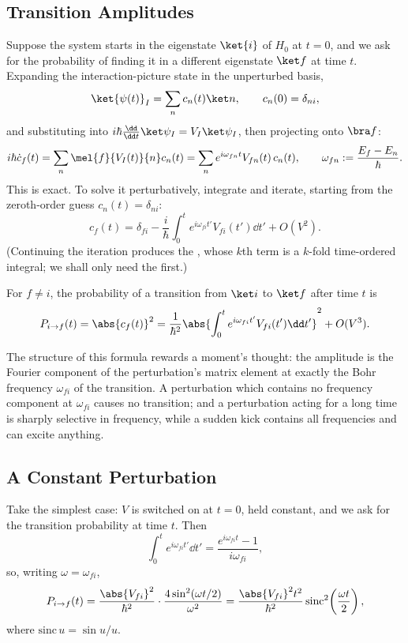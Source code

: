 \subsection{Transition Amplitudes}

Suppose the system starts in the eigenstate $\ket{i}$ of $H_0$ at $t=0$, and we ask for the probability of finding it in a different eigenstate $\ket f$ at time $t$. Expanding the interaction-picture state in the unperturbed basis,
$$
\ket{\psi(t)}_I = \sum_n c_n(t)\ket n, \qquad c_n(0) = \delta_{ni},
$$
and substituting into $i\hbar\frac{\dd}{\dd t}\ket\psi_I = V_I\ket\psi_I$, then projecting onto $\bra f$:
$$
i\hbar \dot c_f(t) = \sum_n \mel{f}{V_I(t)}{n}c_n(t) = \sum_n e^{i\omega_{fn}t}V_{fn}(t)\,c_n(t), \qquad \omega_{fn} := \frac{E_f - E_n}{\hbar}.
$$
This is exact. To solve it perturbatively, integrate and iterate, starting from the zeroth-order guess $c_n(t) = \delta_{ni}$:
$$
c_f(t) = \delta_{fi} - \frac{i}{\hbar}\int_0^t e^{i\omega_{fi}t'}V_{fi}(t')\dd t' + O(V^2).
$$
(Continuing the iteration produces the , whose $k$th term is a $k$-fold time-ordered integral; we shall only need the first.)

\begin{theorem}
    For $f \neq i$, the probability of a transition from $\ket i$ to $\ket f$ after time $t$ is
    $$
    P_{i\to f}(t) = \abs{c_f(t)}^2 = \frac{1}{\hbar^2}\abs{\int_0^t e^{i\omega_{fi}t'}V_{fi}(t')\dd t'}^2 + O(V^3).
    $$
\end{theorem}

The structure of this formula rewards a moment's thought: the amplitude is the Fourier component of the perturbation's matrix element at exactly the Bohr frequency $\omega_{fi}$ of the transition. A perturbation which contains no frequency component at $\omega_{fi}$ causes no transition; and a perturbation acting for a long time is sharply selective in frequency, while a sudden kick contains all frequencies and can excite anything.

\subsection{A Constant Perturbation}

Take the simplest case: $V$ is switched on at $t=0$, held constant, and we ask for the transition probability at time $t$. Then
$$
\int_0^t e^{i\omega_{fi}t'}\dd t' = \frac{e^{i\omega_{fi}t}-1}{i\omega_{fi}},
$$
so, writing $\omega = \omega_{fi}$,
$$
P_{i\to f}(t) = \frac{\abs{V_{fi}}^2}{\hbar^2}\cdot\frac{4\sin^2(\omega t/2)}{\omega^2}
= \frac{\abs{V_{fi}}^2 t^2}{\hbar^2}\,\mathrm{sinc}^2\!\left( \frac{\omega t}{2} \right),
$$
where $\mathrm{sinc}\,u = \sin u / u$.

